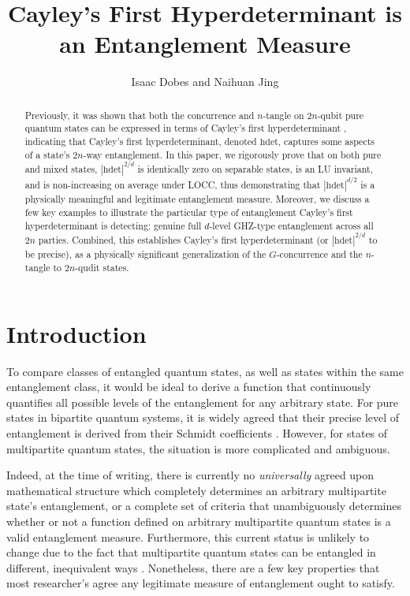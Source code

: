 \documentclass{article}
\begin{document}
\title{Cayley's First Hyperdeterminant is an Entanglement Measure}
\author{Isaac Dobes and Naihuan Jing}
\maketitle

\begin{abstract}
    Previously, it was shown that both the concurrence and $n$-tangle on $2n$-qubit pure quantum states can be expressed in terms of Cayley's first hyperdeterminant \cite{dobes2024qubits}, indicating that Cayley's first hyperdeterminant, denoted $\mathrm{hdet}$, captures some aspects of a state's $2n$-way entanglement. In this paper, we rigorously prove that on both pure and mixed states, $|\mathrm{hdet}|^{2/d}$ is identically zero on separable states, is an LU invariant, and is non-increasing on average under LOCC, thus demonstrating that $|\mathrm{hdet}|^{d/2}$ is a physically meaningful and legitimate entanglement measure. Moreover, we discuss a few key examples to illustrate the particular type of entanglement Cayley's first hyperdeterminant is detecting: genuine full $d$-level GHZ-type entanglement across all $2n$ parties. Combined, this establishes Cayley's first hyperdeterminant (or $|\mathrm{hdet}|^{2/d}$ to be precise), as a physically significant generalization of the $G$-concurrence and the $n$-tangle to $2n$-qudit states. 
\end{abstract}

\section{Introduction}
To compare classes of entangled quantum states, as well as states within the same entanglement class, it would be ideal to derive a function that continuously quantifies all possible levels of the entanglement for any arbitrary state. For pure states in bipartite quantum systems, it is widely agreed that their precise level of entanglement is derived from their Schmidt coefficients \cite{nielsen2010quantum,ma2024multipartite}. However, for states of multipartite quantum states, the situation is more complicated and ambiguous. 

Indeed, at the time of writing, there is currently no \textit{universally} agreed upon mathematical structure which completely determines an arbitrary multipartite state's entanglement, or a complete set of criteria that unambiguously determines whether or not a function defined on arbitrary multipartite quantum states is a valid entanglement measure. Furthermore, this current status is unlikely to change \cite{walter2016multipartite} due to the fact that multipartite quantum states can be entangled in different, inequivalent ways \cite{dur2000three}. Nonetheless, there are a few key properties that most researcher's agree any legitimate measure of entanglement ought to satisfy. 
\end{document}
